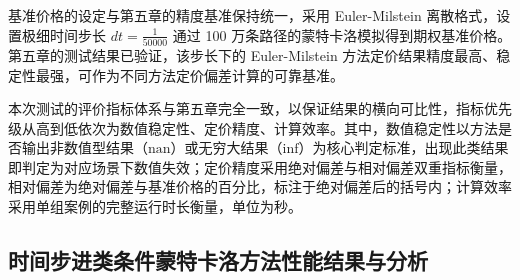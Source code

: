 基准价格的设定与第五章的精度基准保持统一，采用 Euler-Milstein 离散格式，设置极细时间步长 $dt = \frac{1}{50000}$
通过 100 万条路径的蒙特卡洛模拟得到期权基准价格。第五章的测试结果已验证，该步长下的 Euler-Milstein 方法定价结果精度最高、稳定性最强，可作为不同方法定价偏差计算的可靠基准。

本次测试的评价指标体系与第五章完全一致，以保证结果的横向可比性，指标优先级从高到低依次为数值稳定性、定价精度、计算效率。其中，数值稳定性以方法是否输出非数值型结果（$\mathrm{nan}$）或无穷大结果（$\mathrm{inf}$）为核心判定标准，出现此类结果即判定为对应场景下数值失效；定价精度采用绝对偏差与相对偏差双重指标衡量，相对偏差为绝对偏差与基准价格的百分比，标注于绝对偏差后的括号内；计算效率采用单组案例的完整运行时长衡量，单位为秒。

\subsection{时间步进类条件蒙特卡洛方法性能结果与分析}

